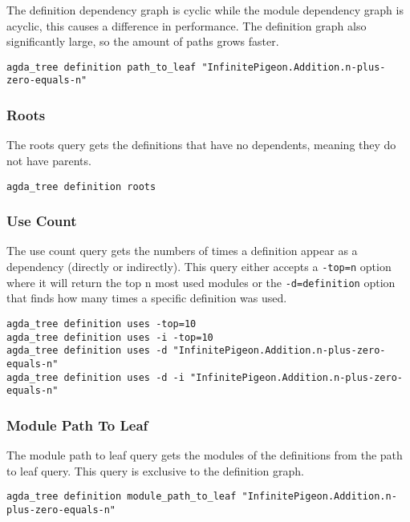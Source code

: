 The definition dependency graph is cyclic while the module dependency graph is
acyclic, this causes a difference in performance.  The definition graph also
significantly large, so the amount of paths grows faster.

\begin{lstlisting}
agda_tree definition path_to_leaf "InfinitePigeon.Addition.n-plus-zero-equals-n"
\end{lstlisting}

\subsubsection{Roots}

The roots query gets the definitions that have no dependents, meaning they do
not have parents.

\begin{lstlisting}
agda_tree definition roots
\end{lstlisting}

\subsubsection{Use Count}

The use count query gets the numbers of times a definition appear as a
dependency (directly or indirectly). This query either accepts a
\texttt{-top=n} option where it will return the top n most used modules or the
\texttt{-d=definition} option that finds how many times a specific definition
was used.

\begin{lstlisting}
agda_tree definition uses -top=10
agda_tree definition uses -i -top=10
agda_tree definition uses -d "InfinitePigeon.Addition.n-plus-zero-equals-n"
agda_tree definition uses -d -i "InfinitePigeon.Addition.n-plus-zero-equals-n"
\end{lstlisting}

\subsubsection{Module Path To Leaf}

The module path to leaf query gets the modules of the definitions from the path
to leaf query. This query is exclusive to the definition graph.

\begin{lstlisting}
agda_tree definition module_path_to_leaf "InfinitePigeon.Addition.n-plus-zero-equals-n"
\end{lstlisting}

